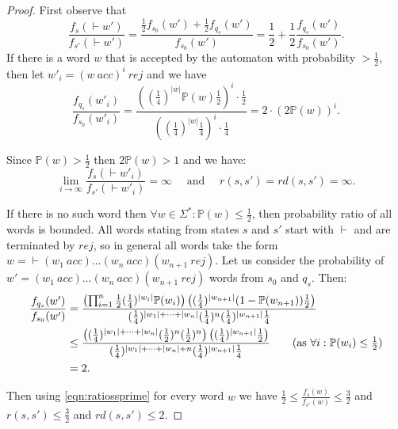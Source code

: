 \documentclass[10pt,a4paper]{amsart}
\numberwithin{equation}{section}
\theoremstyle{plain}
\theoremstyle{definition}
\theoremstyle{remark}
\newcommand\acc{\mathit{acc}}
\newcommand\rej{\mathit{rej}}
\newcommand\pbra[1]{\left( #1 \right)}
\newcommand\pr{\mathbb{P}}
\newcommand\tvra{\mathit{r}}
\newcommand\tvrs{\mathit{rd}}
\renewcommand\nu{f}
\begin{document}
\begin{proof}

First observe that
\begin{equation} \label{eqn:ratiossprime}
\frac{\nu_s({\vdash} w')}{\nu_{s'}({\vdash} w')} =\frac{\frac{1}{2}\nu_{s_0}(w') + \frac{1}{2}\nu_{q_s}(w')}{\nu_{s_0}(w')} = \frac{1}{2} + \frac{1}{2}\frac{\nu_{q_s}(w')}{\nu_{s_0}(w')}.
\end{equation}
If there is a word $w$ that is accepted by the automaton with probability
$>\frac{1}{2}$, then let $w'_i = (w\ \acc)^i\ \rej$ and we have
\begin{equation} \label{eqn:wordgoesunbounded}
\frac{\nu_{q_s}(w'_i)}{\nu_{s_0}(w'_i)}
= \frac{((\frac{1}{4})^{|w|}\pr(w)\frac{1}{2})^i \cdot \frac{1}{2}}{((\frac{1}{4})^{|w|}\frac{1}{4})^i\cdot \frac{1}{4}} = 2 \cdot (2 \pr(w))^i.
\end{equation}

\noindent Since $\pr(w) > \frac{1}{2}$ then $2\pr(w) > 1$ and we have:
\[
\lim_{i\to\infty}\frac{\nu_s({\vdash}w'_i)}{\nu_{s'}({\vdash}w'_i)} = \infty \quad \text{ and } \quad  \tvra(s,s') =  \tvrs(s,s') = \infty.
\]

If there is no such word then $\forall w\in\Sigma^*: \pr(w) \le \frac{1}{2}$, then probability ratio of all words is bounded. All words stating from states $s$ and $s'$ start with ${\vdash}$ and are terminated by $\rej$, so in general all words take the form $w = {\vdash}(w_1\ \acc)\dots (w_n\ \acc)(w_{n+1}\ \rej)$. Let us consider the probability of $w' = (w_1\ \acc)\dots (w_n\ \acc)(w_{n+1}\ \rej)$ words from $s_0$ and $q_s$. Then:
\begin{align}
\frac{\nu_{q_s}(w')}{\nu_{s_0}(w')} &= \frac{\pbra{\prod_{i=1}^n \frac{1}{2}(\frac{1}{4})^{|w_i|}\pr(w_i)}\pbra{(\frac{1}{4})^{|w_{n+1}|}(1-\pr(w_{n+1}))\frac{1}{2}}}{(\frac{1}{4})^{|w_1| + \dots + |w_n|}(\frac{1}{4})^n(\frac{1}{4})^{|w_{n+1}|}\frac{1}{4}}
\\& \le \frac{\pbra{(\frac{1}{4})^{|w_1| + \dots + |w_n|}(\frac{1}{2})^n(\frac{1}{2})^n}\pbra{(\frac{1}{4})^{|w_{n+1}|}\frac{1}{2}}}{(\frac{1}{4})^{|w_1| + \dots + |w_n| + n}(\frac{1}{4})^{|w_{n+1}|}\frac{1}{4}}
\tag{as $\forall i: \pr(w_i) \le \frac{1}{2}$}
\\&= 2. \label{eqn:boundedtwo}
\end{align}

Then using \cref{eqn:ratiossprime} for every word $w$ we have $\frac{1}{2} \le \frac{\nu_s(w)}{\nu_{s'}(w)} \le \frac{3}{2}$ and $\tvra(s,s')\le \frac{3}{2}$ and $\tvrs(s,s')\le 2$.
\end{proof}
\end{document}
